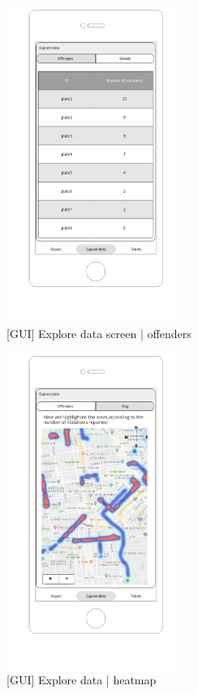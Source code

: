 \begin{figure}[H]
		\centering
      \includegraphics[width=0.5\textwidth]{GUI/offenders.png}
      \caption{[GUI] Explore data screen | offenders}   \label{fig:offenders}
\end{figure}


\begin{figure}[H]
		\centering
      \includegraphics[width=0.5\textwidth]{GUI/heatmap.png}
      \caption{[GUI] Explore data | heatmap}   \label{fig:heatmap}
\end{figure}


